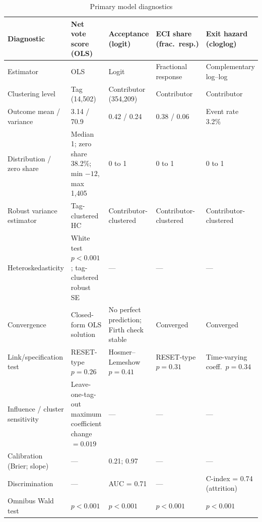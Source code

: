 \begin{table}[t]
\centering
\caption{Primary model diagnostics}
\label{tab:diagnostics}
\scriptsize
\setlength{\tabcolsep}{3pt}
\begin{tabular}{p{}p{}p{}p{}p{}}
\toprule
Diagnostic & Net vote score (OLS) & Acceptance (logit) & ECI share (frac.\ resp.) & Exit hazard (cloglog) \\
\midrule
Estimator & OLS & Logit & Fractional response & Complementary log--log \\
Clustering level & Tag (14,502) & Contributor (354,209) & Contributor & Contributor \\
Outcome mean / variance & 3.14 / 70.9 & 0.42 / 0.24 & 0.38 / 0.06 & Event rate 3.2\% \\
Distribution / zero share & Median 1; zero share 38.2\%; min $-12$, max 1,405 & 0 to 1 & 0 to 1 & 0 to 1 \\
Robust variance estimator & Tag-clustered HC & Contributor-clustered & Contributor-clustered & Contributor-clustered \\
Heteroskedasticity & White test $p<0.001$; tag-clustered robust SE & --- & --- & --- \\
Convergence & Closed-form OLS solution & No perfect prediction; Firth check stable & Converged & Converged \\
Link/specification test & RESET-type $p=0.26$ & Hosmer--Lemeshow $p=0.41$ & RESET-type $p=0.31$ & Time-varying coeff.\ $p=0.34$ \\
Influence / cluster sensitivity & Leave-one-tag-out maximum coefficient change $=0.019$ & --- & --- & --- \\
Calibration (Brier; slope) & --- & 0.21; 0.97 & --- & --- \\
Discrimination & --- & AUC = 0.71 & --- & C-index = 0.74 (attrition) \\
Omnibus Wald test & $p<0.001$ & $p<0.001$ & $p<0.001$ & $p<0.001$ \\
\bottomrule
\end{tabular}
\end{table}

